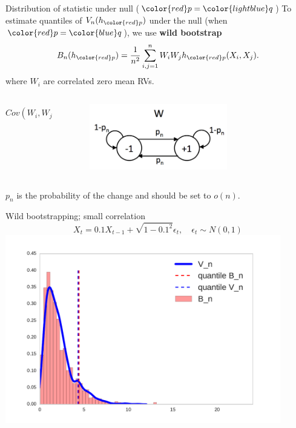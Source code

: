 \documentclass{beamer}
\begin{document}
 
  \begin{frame}{Distribution of statistic under null (${ \color{red} p} =  {\color{lightblue} q}$)}
To estimate quantiles of $ V_n(h_{\color{red} p})$ under the null  (when ${ \color{red} p} =  {\color{blue} q}$), we use {\bf wild bootstrap}
\[
 B_n(h_{\color{red} p}) = \frac {1} {n^2} \sum_{i,j=1}^n W_i W_j h_{\color{red} p}(X_i,X_j).
\]
  where $W_i$ are correlated zero mean RVs.
  
 \vspace{-0.3cm} 
\begin{columns}
        \begin{column}{.5\textwidth}
         $$
  Cov(W_i,W_j) = (1-2p_n)^{-|i-j|}
  $$
        \end{column}
        \begin{column}{.5\textwidth}
            \begin{figure}
            \vspace{-0.5cm}
           \includegraphics[width=0.7\textwidth, angle =0 ]{./img/W_graphicalModel.pdf} 
        \end{figure}
        \end{column}
    \end{columns}
    $p_n$ is  the probability of the change  and should be set to $o(n)$.
  \end{frame}

 \begin{frame}{Wild bootstrapping; small correlation }
\centering
 $$X_t = 0.1 X_{t-1} + \sqrt{1 - 0.1^2}\epsilon_t, \quad \epsilon_t \sim N(0,1)$$
 \includegraphics[width=0.9\textwidth]{./img/bootstrapWorks1.pdf}

 \end{frame}
\end{document}
